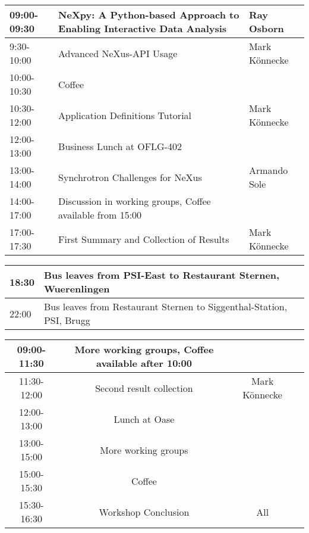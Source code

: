 \documentclass[a4paper]{article}\usepackage[dvips]{graphicx}
\begin{document}
\begin{table}[!ht]
\begin{tabular}{|p{2cm}|p{7cm}|p{4cm}|}
\hline
09:00-09:30& \begin{minipage}{5cm} NeXpy: A Python-based Approach to 
 Enabling Interactive Data Analysis\end{minipage}
 &Ray Osborn\\ \hline
9:30-10:00&Advanced NeXus-API Usage& Mark K\"onnecke\\ \hline
10:00-10:30&Coffee& \\ \hline
10:30-12:00&Application Definitions Tutorial&Mark K\"onnecke\\ \hline
12:00-13:00&Business Lunch at OFLG-402& \\ \hline
13:00-14:00&Synchrotron Challenges for NeXus&Armando Sole\\ \hline
14:00-17:00&Discussion in working groups, Coffee available from 15:00& \\ \hline
17:00-17:30&First Summary and Collection of Results& Mark K\"onnecke\\ \hline
\end{tabular}
\end{table}


\begin{table}[!ht]
\begin{tabular}{|p{2cm}|p{11cm}|}
\hline
 18:30&Bus leaves from PSI-East to Restaurant Sternen, Wuerenlingen \\ \hline
22:00&Bus leaves from Restaurant Sternen to Siggenthal-Station, PSI, Brugg \\ \hline
\end{tabular}
\end{table}

\clearpage




\begin{table}[!ht]
\begin{tabular}{|c|c|c|c|}
\hline
 09:00-11:30&More working groups, Coffee available after 10:00& \\ \hline
11:30-12:00&Second result collection&Mark K\"onnecke\\ \hline
12:00-13:00&Lunch at Oase& \\ \hline
13:00-15:00&More working groups& \\ \hline
15:00-15:30&Coffee & \\ \hline
15:30-16:30&Workshop Conclusion& All\\ \hline
\end{tabular}
\end{table}
\end{document}
